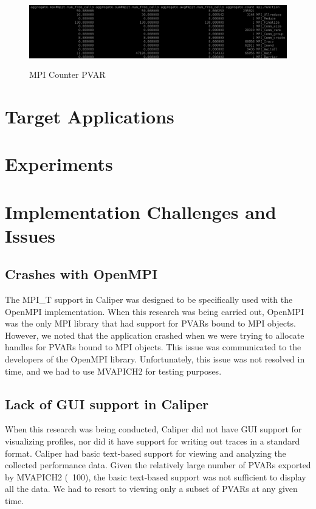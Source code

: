 \begin{center}
	\begin{figure}[tbp!]
         \centering
		\includegraphics[scale=0.8, width=\columnwidth, height=3cm]{figures/CALIPER_MPI_counter_PVAR}
		\caption{MPI Counter PVAR}
		\label{fig:cali-counter}
	\end{figure}
\end{center}

\section{Target Applications}
\section{Experiments}

\section {Implementation Challenges and Issues}
\subsection{Crashes with OpenMPI}
The MPI\_T support in Caliper was designed to be specifically used with the OpenMPI implementation. When this research was being carried out, OpenMPI was the only MPI library that had support for PVARs bound to MPI objects. However, we noted that the application crashed when we were trying to allocate handles for PVARs bound to MPI objects. This issue was communicated to the developers of the OpenMPI library. Unfortunately, this issue was not resolved in time, and we had to use MVAPICH2 for testing purposes.

\subsection{Lack of GUI support in Caliper}
When this research was being conducted, Caliper did not have GUI support for visualizing profiles, nor did it have support for writing out traces in a standard format. Caliper had basic text-based support for viewing and analyzing the collected performance data. Given the relatively large number of PVARs exported by MVAPICH2 (~100), the basic text-based support was not sufficient to display all the data. We had to resort to viewing only a subset of PVARs at any given time.
